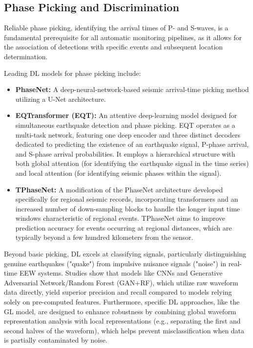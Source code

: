 \documentclass[a4paper,12pt]{report}
\begin{document}
\subsection{Phase Picking and Discrimination}
\label{sec:1.3.1}

Reliable phase picking, identifying the arrival times of P- and S-waves, is a fundamental prerequisite for all automatic monitoring pipelines, as it allows for the association of detections with specific events and subsequent location determination.

Leading DL models for phase picking include:
\begin{itemize}
\item \textbf{PhaseNet:} A deep-neural-network-based seismic arrival-time picking method utilizing a U-Net architecture.
\item \textbf{EQTransformer (EQT):} An attentive deep-learning model designed for simultaneous earthquake detection and phase picking. EQT operates as a multi-task network, featuring one deep encoder and three distinct decoders dedicated to predicting the existence of an earthquake signal, P-phase arrival, and S-phase arrival probabilities. It employs a hierarchical structure with both global attention (for identifying the earthquake signal in the time series) and local attention (for identifying seismic phases within the signal).
\item \textbf{TPhaseNet:} A modification of the PhaseNet architecture developed specifically for regional seismic records, incorporating transformers and an increased number of down-sampling blocks to handle the longer input time windows characteristic of regional events. TPhaseNet aims to improve prediction accuracy for events occurring at regional distances, which are typically beyond a few hundred kilometers from the sensor.
\end{itemize}

Beyond basic picking, DL excels at classifying signals, particularly distinguishing genuine earthquakes ("quake") from impulsive nuisance signals ("noise") in real-time EEW systems. Studies show that models like CNNs and Generative Adversarial Network/Random Forest (GAN+RF), which utilize raw waveform data directly, yield superior precision and recall compared to models relying solely on pre-computed features. Furthermore, specific DL approaches, like the GL model, are designed to enhance robustness by combining global waveform representation analysis with local representations (e.g., separating the first and second halves of the waveform), which helps prevent misclassification when data is partially contaminated by noise.
\end{document}
